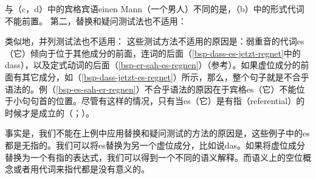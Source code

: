 \zl
与（c，d）中的宾格宾语einen Mann（一个男人）不同的是，（b）中的形式代词不能前置。
第二，替换和疑问测试法也不适用：
\eal
{}
\zl

\noindent
类似地，并列测试法也不适用：
\z
这些测试方法不适用的原因是：弱重音的代词es（它）倾向于位于其他成分的前面，连词的后面（\ref{bsp-dass-es-jetzt-regnet}中的dass），以及定式动词的后面（\ref{bsp-er-sah-es-regnen}）（参考\citealp[]{Abraham95a-u}）。如果虚位成分的前面有其它成分，如（\ref{bsp-dass-jetzt-es-regnet}）所示，那么，整个句子就是不合乎语法的。例（\ref{bsp-es-sah-er-regnen}）不合乎语法的原因在于宾格es（它）不能位于小句句首的位置。尽管有这样的情况，只有当es（它）是有指（referential）的时候才是成立的（\citealt[]{Lenerz94a}；\citealp[]{GS97a}）。

事实是，我们不能在上例中应用替换和疑问测试的方法的原因是，这些例子中的es都是无指的。我们可以将es替换为另一个虚位成分，比如说das。如果将虚位成分替换为一个有指的表达式，我们可以得到一个不同的语义解释。而语义上的空位概念或者用代词来指代都是没有意义的。

